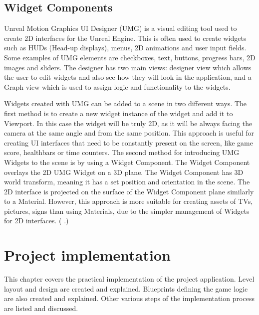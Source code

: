 \documentclass[12pt, a4paper,oneside, nocenter]{thesis}
\newcommand{\citeyeartitlexamk}[1]{(\usebibentry{#1}{title} \citeyear{#1}.)}
\begin{document}
\section{Widget Components}
Unreal Motion Graphics UI Designer (UMG) is a visual editing tool used to create 2D interfaces for the Unreal Engine. This is often used to create widgets such as HUDs (Head-up displays), menus, 2D animations and user input fields. Some examples of UMG elements are checkboxes, text, buttons, progress bars, 2D images and sliders. The designer has two main views: designer view which allows the user to edit widgets and also see how they  will look in the application, and a Graph view which is used to assign logic and functionality to the widgets.
\par
Widgets created with UMG can be added to a scene in two different ways. The first method is to create a new widget instance of the widget and add it to Viewport. In this case the widget will be truly 2D, as it will be always facing the camera at the same angle and from the same position. This approach is useful for creating UI interfaces that need to be constantly present on the screen, like game score, healthbars or time counters. The second method for introducing UMG Widgets to the scene is by using a Widget Component. The Widget Component overlays the 2D UMG Widget on a 3D plane. The Widget Component has 3D world transform, meaning it has a set position and orientation in the scene. The 2D interface is projected on the surface of the Widget Component plane similarly to a Material. However, this approach is more suitable for creating assets of TVs, pictures, signs than using Materials, due to the simpler management of Widgets for 2D interfaces. \citeyeartitlexamk{ue-umg}
\par
\chapter{\texorpdfstring{Project implementation}{proj-impl}}
This chapter covers the practical implementation of the project application. Level layout and design are created and explained. Blueprints defining the game logic are also created and explained. Other various steps of the implementation process are listed and discussed.
\end{document}
